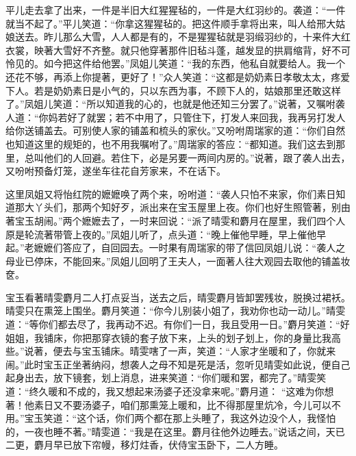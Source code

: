 \begin{parag}


    平儿走去拿了出来，一件是半旧大红猩猩毡的，一件是大红羽纱的。袭道：“一件就当不起了。”平儿笑道：“你拿这猩猩毡的。把这件顺手拿将出来，叫人给邢大姑娘送去。昨儿那么大雪，人人都是有的，不是猩猩毡就是羽缎羽纱的，十来件大红衣裳，映著大雪好不齐整。就只他穿著那件旧毡斗蓬，越发显的拱肩缩背，好不可怜见的。如今把这件给他罢。”凤姐儿笑道：“我的东西，他私自就要给人。我一个还花不够，再添上你提著，更好了！”众人笑道：“这都是奶奶素日孝敬太太，疼爱下人。若是奶奶素日是小气的，只以东西为事，不顾下人的，姑娘那里还敢这样了。”凤姐儿笑道：“所以知道我的心的，也就是他还知三分罢了。”说著，又嘱咐袭人道：“你妈若好了就罢；若不中用了，只管住下，打发人来回我，我再另打发人给你送铺盖去。可别使人家的铺盖和梳头的家伙。”又吩咐周瑞家的道：“你们自然也知道这里的规矩的，也不用我嘱咐了。”周瑞家的答应：“都知道。我们这去到那里，总叫他们的人回避。若住下，必是另要一两间内房的。”说著，跟了袭人出去，又吩咐预备灯笼，遂坐车往花自芳家来，不在话下。
\end{parag}


\begin{parag}


    这里凤姐又将怡红院的嬷嬷唤了两个来，吩咐道：“袭人只怕不来家，你们素日知道那大丫头们，那两个知好歹，派出来在宝玉屋里上夜。你们也好生照管著，别由著宝玉胡闹。”两个嬷嬷去了，一时来回说：“派了晴雯和麝月在屋里，我们四个人原是轮流著带管上夜的。”凤姐儿听了，点头道：“晚上催他早睡，早上催他早起。”老嬷嬷们答应了，自回园去。一时果有周瑞家的带了信回凤姐儿说：“袭人之母业已停床，不能回来。”凤姐儿回明了王夫人，一面著人往大观园去取他的铺盖妆奁。
\end{parag}


\begin{parag}


    宝玉看著晴雯麝月二人打点妥当，送去之后，晴雯麝月皆卸罢残妆，脱换过裙袄。晴雯只在熏笼上围坐。麝月笑道：“你今儿别装小姐了，我劝你也动一动儿。”晴雯道：“等你们都去尽了，我再动不迟。有你们一日，我且受用一日。”麝月笑道：“好姐姐，我铺床，你把那穿衣镜的套子放下来，上头的划子划上，你的身量比我高些。”说著，便去与宝玉铺床。晴雯嗐了一声，笑道：“人家才坐暖和了，你就来闹。”此时宝玉正坐著纳闷，想袭人之母不知是死是活，忽听见晴雯如此说，便自己起身出去，放下镜套，划上消息，进来笑道：“你们暖和罢，都完了。”晴雯笑道：“终久暖和不成的，我又想起来汤婆子还没拿来呢。”麝月道： “这难为你想著！他素日又不要汤婆子，咱们那熏笼上暖和，比不得那屋里炕冷，今儿可以不用。”宝玉笑道：“这个话，你们两个都在那上头睡了，我这外边没个人，我怪怕的，一夜也睡不著。”晴雯道：“我是在这里。麝月往他外边睡去。”说话之间，天已二更，麝月早已放下帘幔，移灯炷香，伏侍宝玉卧下，二人方睡。
\end{parag}


